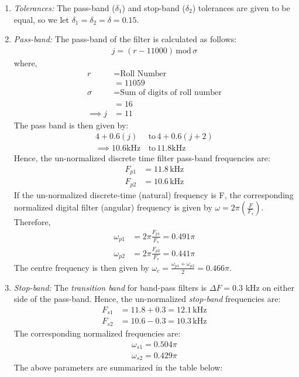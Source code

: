 \documentclass{article}
\begin{document}
\begin{enumerate}
\item {\em Tolerances:}  The pass-band ($\delta_1$) and stop-band ($\delta_2$) tolerances are given to
be equal, so we let $\delta_1 = \delta_2 = \delta = 0.15$.

\item {\em Pass-band:}  The pass-band of the filter is calculated as follows: 
\begin{align*}
    j = (r - 11000) \, \text{mod} \, \sigma
\end{align*}
where, 
\begin{align*}
    r &= \text{Roll Number}\\
    &= 11059\\
    \sigma &= \text{Sum of digits of roll number}\\
    &= 16\\
    \implies j &= 11
\end{align*}
The pass band is then given by:
\begin{align*}
    4 + 0.6(j)\,  &\text{to} \, 4 + 0.6( j + 2)\\ 
    \implies 10.6 \text{kHz} \, &\text{to} \, 11.8\text{kHz} 
\end{align*}
Hence, the un-normalized discrete time filter
pass-band frequencies are:
\begin{align*}
    F_{p1} &= 11.8\, \text{kHz}\\
    F_{p2} &= 10.6\, \text{kHz}
\end{align*}
If the un-normalized  discrete-time (natural) frequency is F, the corresponding normalized digital filter (angular) frequency is given by $\omega = 2\pi
\left(\frac{F}{F_s}\right)$. Therefore,
\begin{align*}
\omega_{p1} &= 2\pi\frac{F_{p1}}{F_s}  = 0.491\pi\\ \omega_{p2} &= 2\pi\frac{F_{p2}}{F_s}  = 0.441\pi 
\end{align*}
The centre frequency is then given by  $\omega_c = \frac{\omega_{p1} + \omega_{p2}}{2} = 0.466\pi$.  

\item {\em Stop-band:}  The {\em transition band} for band-pass filters is $\Delta F = 0.3$ kHz on either side of the pass-band.
Hence, the un-normalized {\em stop-band} frequencies are:
\begin{align*}
F_{s1} &= 11.8 + 0.3 = 12.1\, \text{kHz}\\
F_{s2} &= 10.6 - 0.3 = 10.3\, \text{kHz}
\end{align*}
The corresponding normalized frequencies are:
\begin{align*}
    \omega_{s1} = 0.504 \pi\\
    \omega_{s2} =  0.429 \pi
\end{align*}
The above parameters are summarized in the table below:

\end{enumerate}
\end{document}
